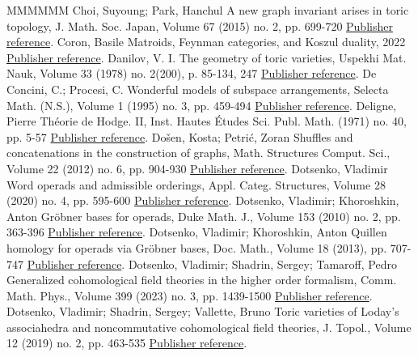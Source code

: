 \begin{thebibliography}{MMMMMM}
 Choi, Suyoung; Park, Hanchul A new graph invariant arises in toric topology, J. Math. Soc. Japan, Volume 67 (2015) no. 2, pp. 699-720 \href{https://alco.centre-mersenne.org/articles/10.5802/alco.347/#MR3340192}{Publisher reference}.
 Coron, Basile Matroids, Feynman categories, and Koszul duality, 2022 \href{https://alco.centre-mersenne.org/articles/10.5802/alco.347/#CoronLattices}{Publisher reference}.
 Danilov, V. I. The geometry of toric varieties, Uspekhi Mat. Nauk, Volume 33 (1978) no. 2(200), p. 85-134, 247 \href{https://alco.centre-mersenne.org/articles/10.5802/alco.347/#MR495499}{Publisher reference}.
 De Concini, C.; Procesi, C. Wonderful models of subspace arrangements, Selecta Math. (N.S.), Volume 1 (1995) no. 3, pp. 459-494 \href{https://alco.centre-mersenne.org/articles/10.5802/alco.347/#MR1366622}{Publisher reference}.
 Deligne, Pierre Théorie de Hodge. II, Inst. Hautes Études Sci. Publ. Math. (1971) no. 40, pp. 5-57 \href{https://alco.centre-mersenne.org/articles/10.5802/alco.347/#MR498551}{Publisher reference}.
 Došen, Kosta; Petrić, Zoran Shuffles and concatenations in the construction of graphs, Math. Structures Comput. Sci., Volume 22 (2012) no. 6, pp. 904-930 \href{https://alco.centre-mersenne.org/articles/10.5802/alco.347/#MR2997505}{Publisher reference}.
 Dotsenko, Vladimir Word operads and admissible orderings, Appl. Categ. Structures, Volume 28 (2020) no. 4, pp. 595-600 \href{https://alco.centre-mersenne.org/articles/10.5802/alco.347/#MR4114993}{Publisher reference}.
 Dotsenko, Vladimir; Khoroshkin, Anton Gröbner bases for operads, Duke Math. J., Volume 153 (2010) no. 2, pp. 363-396 \href{https://alco.centre-mersenne.org/articles/10.5802/alco.347/#MR2667136}{Publisher reference}.
 Dotsenko, Vladimir; Khoroshkin, Anton Quillen homology for operads via Gröbner bases, Doc. Math., Volume 18 (2013), pp. 707-747 \href{https://alco.centre-mersenne.org/articles/10.5802/alco.347/#MR3084563}{Publisher reference}.
 Dotsenko, Vladimir; Shadrin, Sergey; Tamaroff, Pedro Generalized cohomological field theories in the higher order formalism, Comm. Math. Phys., Volume 399 (2023) no. 3, pp. 1439-1500 \href{https://alco.centre-mersenne.org/articles/10.5802/alco.347/#DSVV}{Publisher reference}.
 Dotsenko, Vladimir; Shadrin, Sergey; Vallette, Bruno Toric varieties of Loday’s associahedra and noncommutative cohomological field theories, J. Topol., Volume 12 (2019) no. 2, pp. 463-535 \href{https://alco.centre-mersenne.org/articles/10.5802/alco.347/#MR4072173}{Publisher reference}.

\end{thebibliography}
